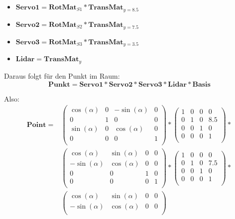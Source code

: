 \documentclass[a4paper,11pt,DIV11]{scrartcl}
\begin{document}
\begin{itemize}
\item $\bm{Servo1} = \bm{RotMat}_{S1} * \bm{TransMat}_{y = 8.5} $
\item $\bm{Servo2} = \bm{RotMat}_{S2} * \bm{TransMat}_{y = 7.5} $
\item $\bm{Servo3} = \bm{RotMat}_{S3} * \bm{TransMat}_{y = 3.5} $
\item $\bm{Lidar}  = \bm{TransMat}_{y} $
\end{itemize}
Daraus folgt für den Punkt im Raum:
\begin{equation}
\bm{Punkt} = \bm{Servo1} * \bm{Servo2} * \bm{Servo3} * \bm{Lidar} * \bm{Basis}
\end{equation}

Also: \\
\begin{align}
\bm{Point} = &
\begin{pmatrix}
\cos(\alpha) & 0 &-\sin(\alpha) & 0 \\
0 & 1 & 0 & 0 \\
\sin(\alpha) & 0 & \cos(\alpha) & 0 \\
0 & 0 & 0 & 1 \\
\end{pmatrix} *
\begin{pmatrix}
1 & 0 & 0 & 0 \\
0 & 1 & 0 & 8.5 \\
0 & 0 & 1 & 0 \\
0 & 0 & 0 & 1 \\
\end{pmatrix} 
* \\ &
\begin{pmatrix}
 \cos(\alpha) & \sin(\alpha) & 0 & 0 \\
-\sin(\alpha) & \cos(\alpha) & 0 & 0 \\
0 & 0 & 1 & 0 \\
0 & 0 & 0 & 1 \\
\end{pmatrix}
*
\begin{pmatrix}
1 & 0 & 0 & 0 \\
0 & 1 & 0 & 7.5 \\
0 & 0 & 1 & 0 \\
0 & 0 & 0 & 1 \\
\end{pmatrix} 
* \\ &
\begin{pmatrix}
 \cos(\alpha) & \sin(\alpha) & 0 & 0 \\
-\sin(\alpha) & \cos(\alpha) & 0 & 0 \\

\end{pmatrix}
\end{align}
\end{document}
